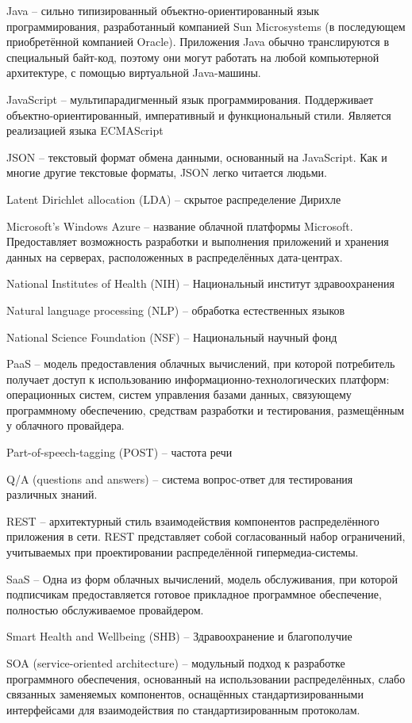 Java -- сильно типизированный объектно-ориентированный язык программирования, разработанный компанией Sun Microsystems (в последующем приобретённой компанией Oracle). Приложения Java обычно транслируются в специальный байт-код, поэтому они могут работать на любой компьютерной архитектуре, с помощью виртуальной Java-машины.

JavaScript -- мультипарадигменный язык программирования. Поддерживает объектно-ориентированный, императивный и функциональный стили. Является реализацией языка ECMAScript

JSON --  текстовый формат обмена данными, основанный на JavaScript. Как и многие другие текстовые форматы, JSON легко читается людьми.

Latent Dirichlet allocation (LDA) -- скрытое распределение Дирихле

Microsoft's Windows Azure -- название облачной платформы Microsoft. Предоставляет возможность разработки и выполнения приложений и хранения данных на серверах, расположенных в распределённых дата-центрах.

National Institutes of Health (NIH) -- Национальный институт здравоохранения

Natural language processing (NLP) -- обработка естественных языков

National Science Foundation (NSF) -- Национальный научный фонд

PaaS -- модель предоставления облачных вычислений, при которой потребитель получает доступ к использованию информационно-технологических платформ: операционных систем, систем управления базами данных, связующему программному обеспечению, средствам разработки и тестирования, размещённым у облачного провайдера.

Part-of-speech-tagging (POST) -- частота речи

Q/A (questions and answers) -- система вопрос-ответ для тестирования различных знаний.

REST -- архитектурный стиль взаимодействия компонентов распределённого приложения в сети. REST представляет собой согласованный набор ограничений, учитываемых при проектировании распределённой гипермедиа-системы.

SaaS -- Одна из форм облачных вычислений, модель обслуживания, при которой подписчикам предоставляется готовое прикладное программное обеспечение, полностью обслуживаемое провайдером.

Smart Health and Wellbeing (SHB) -- Здравоохранение и благополучие

SOA (service-oriented architecture) --  модульный подход к разработке программного обеспечения, основанный на использовании распределённых, слабо связанных заменяемых компонентов, оснащённых стандартизированными интерфейсами для взаимодействия по стандартизированным протоколам.

